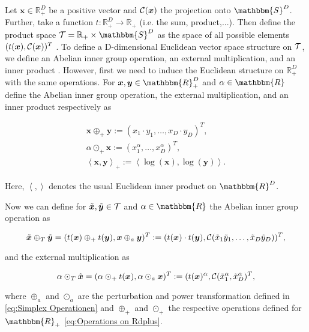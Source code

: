 Let $\bm{x} \in \mathbb{R}^D_+$ be a positive vector and $\mathcal{C}(\bm{x})$ the projection onto $\mathbbm{S}^D$. Further, take a function $t:\mathbb{R}^D_+ \longrightarrow \mathbb{R}_+$ (i.e. the sum, product,...). Then define the product space  $\Tsp = \mathbb{R}_+ \times \mathbbm{S}^D$ as the space of all possible elements $(t(\bm{x}),\mathcal{C}(\bm{x}))^T$ \cite{Pawlowsky:2013}. To define a D-dimensional Euclidean vector space structure on $\mathcal{T}$, we define an Abelian inner group operation, an external multiplication, and an inner product \cite{Pawlowsky:2013}. However, first we need to induce the Euclidean structure on $\mathbb{R}_+^D$ with the same operations. For $\bm{x},\bm{y} \in \mathbbm{R}_+^D$ and $\alpha \in \mathbbm{R}$ define the Abelian inner group operation, the external multiplication, and an inner product respectively as \cite{Pawlowsky:2013}

\begin{gather}
\bm{x} \oplus_+ \bm{y}:= (x_1\cdot y_1,\ldots,x_D \cdot y_D)^T, \\
\alpha \odot_+ \bm{x} := (x_1^{\alpha},\ldots,x_D^{\alpha})^T, \\
\left\langle \bm{x},\bm{y} \right\rangle_+ := \left\langle \log(\bm{x}),\log(\bm{y}) \right\rangle.
\label{eq:Operations on Rdplus}
\end{gather}

Here, $\left\langle ,\right\rangle$ denotes the usual Euclidean inner product on $\mathbbm{R}^D$. 

Now we can define for $\tilde{\bm{x}},\tilde{\bm{y}} \in \mathcal{T}$ and $\alpha \in \mathbbm{R}$ the Abelian inner group operation as 

\begin{equation}
\tilde{\bm{x}} \oplus_T \tilde{\bm{y}} = (t(\bm{x}) \oplus_+ t(\bm{y}), \bm{x} \oplus_a \bm{y})^T := (t(\bm{x}) \cdot t(\bm{y}), \mathcal{C}(\tilde{x}_1\tilde{y}_1,\ldots,\tilde{x}_D\tilde{y}_D))^T,
\label{eq:Abelian inner group operation}
\end{equation}

and the external multiplication as 

\begin{equation}
\alpha \odot_T \tilde{\bm{x}} = (\alpha \odot_+ t(\bm{x}), \alpha \odot_a \bm{x})^T := (t(\bm{x})^{\alpha},\mathcal{C}(\tilde{x}_1^{\alpha},\tilde{x}_D^{\alpha})^T,
\label{eq:external multiplication}
\end{equation}

where $\oplus_a$ and $\odot_a$ are the perturbation and power transformation defined in \ref{eq:Simplex Operationen} and $\oplus_+$ and $\odot_+$ the respective operations defined for $\mathbbm{R}_+$ \ref{eq:Operations on Rdplus}.

